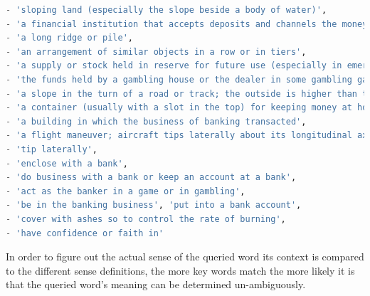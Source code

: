 \documentclass{custom_report}
\begin{document}
\begin{lstlisting}[language=Python, caption=Predefined set of keywords by industry sector, captionpos=b, basicstyle=\small]
- 'sloping land (especially the slope beside a body of water)',
- 'a financial institution that accepts deposits and channels the money into lending activities',
- 'a long ridge or pile',
- 'an arrangement of similar objects in a row or in tiers',
- 'a supply or stock held in reserve for future use (especially in emergencies)',
- 'the funds held by a gambling house or the dealer in some gambling games',
- 'a slope in the turn of a road or track; the outside is higher than the inside in order to reduce the effects of centrifugal force',
- 'a container (usually with a slot in the top) for keeping money at home',
- 'a building in which the business of banking transacted',
- 'a flight maneuver; aircraft tips laterally about its longitudinal axis (especially in turning)',
- 'tip laterally',
- 'enclose with a bank',
- 'do business with a bank or keep an account at a bank',
- 'act as the banker in a game or in gambling',
- 'be in the banking business', 'put into a bank account',
- 'cover with ashes so to control the rate of burning',
- 'have confidence or faith in'
\end{lstlisting}

In order to figure out the actual sense of the queried word its context is compared to the different sense definitions, the more key words match the more likely it is that the queried word's meaning can be determined un-ambiguously. 
\end{document}
